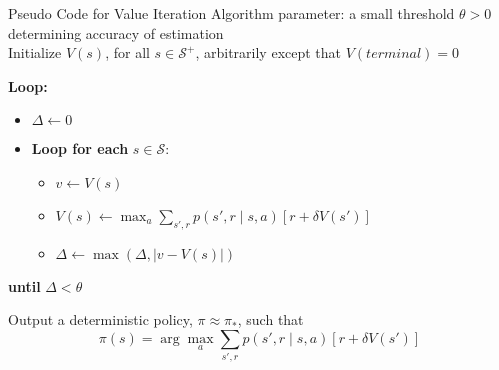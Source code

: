 \documentclass{beamer}
\begin{document}
\begin{frame}{Pseudo Code for Value Iteration}
    Algorithm parameter: a small threshold $\theta > 0$ determining accuracy of estimation \\
Initialize $V(s)$, for all $s \in \mathcal{S}^+$, arbitrarily except that $V(terminal) = 0$

\noindent \textbf{Loop:}
\begin{itemize}
    \item $\Delta \leftarrow 0$
    \item \textbf{Loop for each} $s \in \mathcal{S}$:
    \begin{itemize}
        \item $v \leftarrow V(s)$
        \item $V(s) \leftarrow \max_a \sum_{s',r} p(s',r \mid s,a) \left[ r + \delta V(s') \right]$
        \item $\Delta \leftarrow \max(\Delta, |v - V(s)|)$
    \end{itemize}
\end{itemize}
\textbf{until} $\Delta < \theta$

\noindent Output a deterministic policy, $\pi \approx \pi_*$, such that
\[
\pi(s) = \arg\max_a \sum_{s',r} p(s',r \mid s,a) \left[ r + \delta V(s') \right]
\]
\end{frame}
\end{document}
